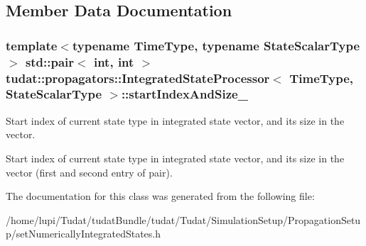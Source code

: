 \subsection{Member Data Documentation}
\subsubsection[{\texorpdfstring{start\+Index\+And\+Size\+\_\+}{startIndexAndSize_}}]{\setlength{\rightskip}{0pt plus 5cm}template$<$typename Time\+Type, typename State\+Scalar\+Type$>$ std\+::pair$<$ int, int $>$ {\bf tudat\+::propagators\+::\+Integrated\+State\+Processor}$<$ Time\+Type, State\+Scalar\+Type $>$\+::start\+Index\+And\+Size\+\_\+}\hypertarget{classtudat_1_1propagators_1_1IntegratedStateProcessor_ae03065ec333ec767023e999ff2f884e5}{}\label{classtudat_1_1propagators_1_1IntegratedStateProcessor_ae03065ec333ec767023e999ff2f884e5}


Start index of current state type in integrated state vector, and its size in the vector. 

Start index of current state type in integrated state vector, and its size in the vector (first and second entry of pair). 

The documentation for this class was generated from the following file\+:\begin{DoxyCompactItemize}
\item 
/home/lupi/\+Tudat/tudat\+Bundle/tudat/\+Tudat/\+Simulation\+Setup/\+Propagation\+Setup/set\+Numerically\+Integrated\+States.\+h\end{DoxyCompactItemize}
